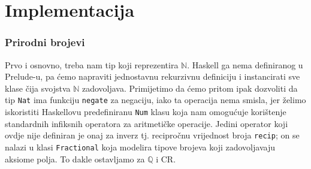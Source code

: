 \documentclass{beamer}
\def\N{\mathbb{N}}
\def\Q{\mathbb{Q}}
\def\CR{\mathrm{CR}}
\begin{document}
\section{Implementacija}
\begin{frame}
    \frametitle{Prirodni brojevi}
    Prvo i osnovno, treba nam tip koji reprezentira $\N$. Haskell
    ga nema definiranog u Prelude-u, pa ćemo napraviti jednostavnu
    rekurzivnu definiciju i instancirati sve klase čija svojstva
    $\N$ zadovoljava. Primijetimo da ćemo pritom ipak dozvoliti da
    tip \texttt{Nat} ima funkciju \texttt{negate} za negaciju, iako
    ta operacija nema smisla, jer želimo iskoristiti Haskellovu
    predefiniranu \texttt{Num} klasu koja nam omogućuje korištenje
    standardnih infiksnih operatora za aritmetičke operacije.
    Jedini operator koji ovdje nije definiran je onaj za inverz
    tj. recipročnu vrijednost broja \texttt{recip}; on se nalazi
    u klasi \texttt{Fractional} koja modelira tipove brojeva koji
    zadovoljavaju aksiome polja. To dakle ostavljamo za $\Q$ i $\CR$.
\end{frame}    
\end{document}
